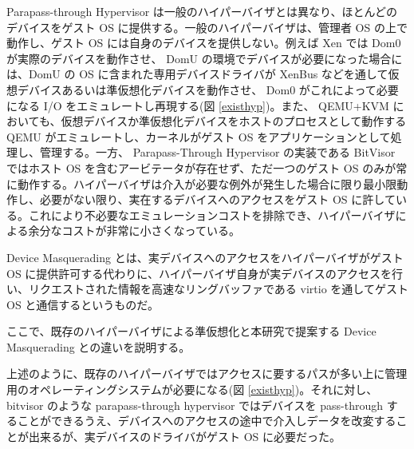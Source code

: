 \documentclass[a4paper,11pt,report]{ltjsbook}
\begin{document}
Parapass-through Hypervisor は一般のハイパーバイザとは異なり、ほとんどのデバイスをゲスト OS に提供する。一般のハイパーバイザは、管理者 OS の上で動作し、ゲスト OS には自身のデバイスを提供しない。例えば Xen では Dom0 が実際のデバイスを動作させ、 DomU の環境でデバイスが必要になった場合には、DomU の OS に含まれた専用デバイスドライバが XenBus などを通して仮想デバイスあるいは準仮想化デバイスを動作させ、 Dom0 がこれによって必要になる I/O をエミュレートし再現する(図 \ref{existhyp})。また、 QEMU+KVM においても、仮想デバイスか準仮想化デバイスをホストのプロセスとして動作する QEMU がエミュレートし、カーネルがゲスト OS をアプリケーションとして処理し、管理する。一方、 Parapass-Through Hypervisor の実装である BitVisor ではホスト OS を含むアービテータが存在せず、ただ一つのゲスト OS のみが常に動作する。ハイパーバイザは介入が必要な例外が発生した場合に限り最小限動作し、必要がない限り、実在するデバイスへのアクセスをゲスト OS に許している。これにより不必要なエミュレーションコストを排除でき、ハイパーバイザによる余分なコストが非常に小さくなっている\cite{bitvisor}。

Device Masquerading とは、実デバイスへのアクセスをハイパーバイザがゲスト OS に提供許可する代わりに、ハイパーバイザ自身が実デバイスのアクセスを行い、リクエストされた情報を高速なリングバッファである virtio\cite{virtio} を通してゲスト OS と通信するというものだ。

ここで、既存のハイパーバイザによる準仮想化と本研究で提案する Device Masquerading との違いを説明する。

上述のように、既存のハイパーバイザではアクセスに要するパスが多い上に管理用のオペレーティングシステムが必要になる(図 \ref{existhyp})。それに対し、 bitvisor のような parapass-through hypervisor ではデバイスを pass-through することができるうえ、デバイスへのアクセスの途中で介入しデータを改変することが出来るが、実デバイスのドライバがゲスト OS に必要だった。
\end{document}
